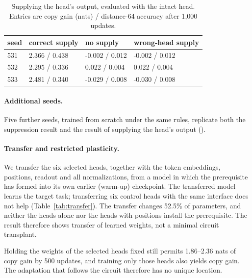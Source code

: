 \begin{table}[htbp]\centering\small
\caption{Supplying the head's output, evaluated with the intact head. Entries are copy gain
(nats) / distance-64 accuracy after 1,000 updates.}\label{tab:supply}
\begin{tabular}{llll}\toprule
seed & correct supply & no supply & wrong-head supply \\
\midrule
531 & 2.366 / 0.438 & -0.002 / 0.012 & -0.002 / 0.012 \\
532 & 2.295 / 0.336 & 0.022 / 0.004 & 0.022 / 0.004 \\
533 & 2.481 / 0.340 & -0.029 / 0.008 & -0.030 / 0.008 \\
\bottomrule\end{tabular}
\end{table}

\paragraph{Additional seeds.}
Five further seeds, trained from scratch under the same rules, replicate both the
suppression result and the result of supplying the head's output
().

\paragraph{Transfer and restricted plasticity.}
We transfer the six selected heads, together with the token embeddings, positions,
readout and all normalizations, from a model in which the prerequisite has formed
into its own earlier (warm-up) checkpoint. The transferred model learns the target
task; transferring six control heads with the same interface does not help
(Table~\ref{tab:transfer}). The transfer changes 52.5\% of parameters, and neither
the heads alone nor the heads with positions install the prerequisite. The result
therefore shows transfer of learned weights, not a minimal circuit transplant.

Holding the weights of the selected heads fixed still permits 1.86--2.36 nats of
copy gain by 500 updates, and training only those heads also yields copy gain. The
adaptation that follows the circuit therefore has no unique location.

